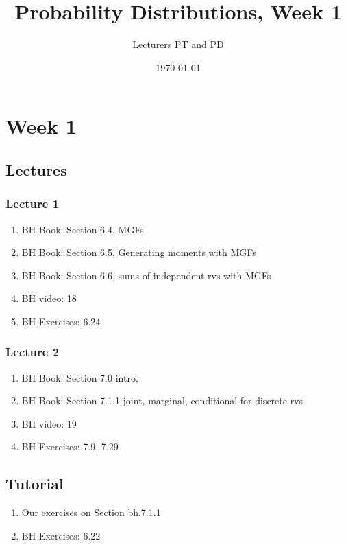 \documentclass[a4paper,11pt]{article}
\author{Lecturers PT and PD
}
\date{\today}
\title{Probability Distributions, Week 1}
\begin{document}
\maketitle
\tableofcontents

\chapter{Week 1}
\label{cha:week-1}



\section{Lectures}
\label{sec:lectures}

\subsection{Lecture 1}
\label{sec:lecture-1}

\begin{enumerate}
\item BH Book: Section 6.4, MGFs
\item BH Book: Section 6.5, Generating moments with MGFs
\item BH Book: Section 6.6,  sums of independent rvs with MGFs
\item BH video: 18
\item BH Exercises: 6.24
\end{enumerate}


\subsection{Lecture 2}
\label{sec:lecture-1}
\begin{enumerate}
\item BH Book: Section 7.0 intro,
\item BH Book: Section 7.1.1 joint, marginal, conditional for discrete rvs
\item BH video: 19
\item BH Exercises: 7.9, 7.29
\end{enumerate}


\section{Tutorial}
\label{sec:tutorial}

\begin{enumerate}
\item Our exercises on Section bh.7.1.1
\item BH Exercises: 6.22
\end{enumerate}
\end{document}
